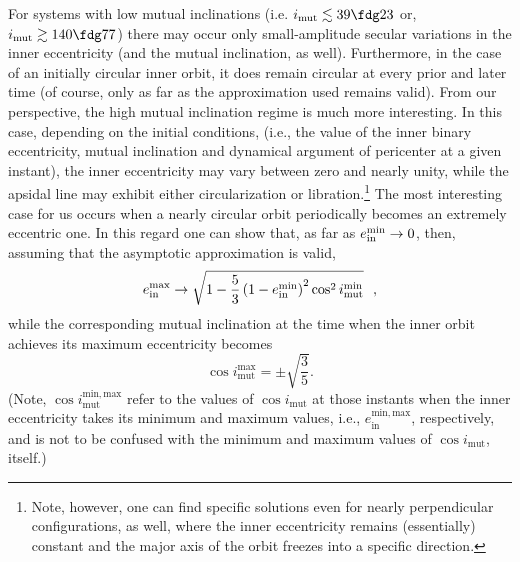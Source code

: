 \documentclass[fleqn,usenatbib]{mnras} %
\begin{document}
For systems with low mutual inclinations (i.e. $i_\mathrm{mut}\lesssim39\fdg23$ or, $i_\mathrm{mut}\gtrsim140\fdg77$) there may occur only small-amplitude secular variations in the inner eccentricity (and the mutual inclination, as well). Furthermore, in the case of an initially circular inner orbit, it does remain circular at every prior and later time (of course, only as far as the approximation used remains valid). From our perspective, the high mutual inclination regime is much more interesting.  In this case, depending on the initial conditions, (i.e., the value of the inner binary eccentricity, mutual inclination and dynamical argument of pericenter at a given instant), the inner eccentricity may vary between zero and nearly unity, while the apsidal line may exhibit either circularization or libration.\footnote{Note, however, one can find specific solutions even for nearly perpendicular configurations, as well, where the inner eccentricity remains (essentially) constant and the major axis of the orbit freezes into a specific direction.} The most interesting case for us occurs when a nearly circular orbit periodically becomes an extremely eccentric one. In this regard one can show that, as far as $e_{\rm in}^\mathrm{min}\rightarrow0$, then, assuming that the asymptotic approximation is valid,
\begin{equation}
e_{\rm in}^\mathrm{max} \rightarrow \sqrt{1-\frac{5}{3}\left(1-e_\mathrm{in}^\mathrm{min}\right)^2\cos^2i_{\rm mut}^\mathrm{min}}~~,
\end{equation}
while the corresponding mutual inclination at the time when the inner orbit achieves its maximum eccentricity becomes
\begin{equation}
\cos i_\mathrm{mut}^\mathrm{max}=\pm\sqrt{\frac{3}{5}}.
\end{equation}
(Note, $\cos i_\mathrm{mut}^\mathrm{min,max}$ refer to the values of $\cos i_\mathrm{mut}$ at those instants when the inner eccentricity takes its minimum and maximum values, i.e., $e_\mathrm{in}^\mathrm{min,max}$, respectively, and is not to be confused with the minimum and maximum values of $\cos i_\mathrm{mut}$, itself.)
\end{document}
